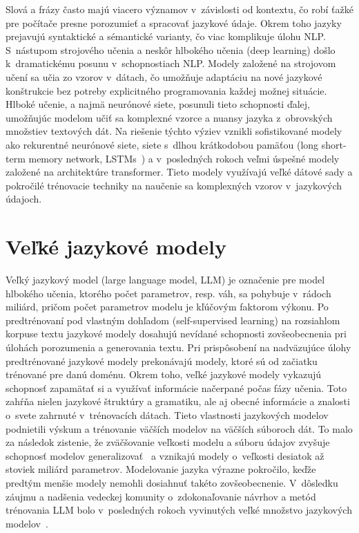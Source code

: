Slová a frázy často majú viacero významov v~závislosti od kontextu, čo robí ťažké pre počítače presne porozumieť a spracovať jazykové údaje. Okrem toho jazyky prejavujú syntaktické a sémantické varianty, čo viac komplikuje úlohu NLP. S~nástupom strojového učenia a neskôr hlbokého učenia (deep learning) došlo k~dramatickému posunu v~schopnostiach NLP. Modely založené na strojovom učení sa učia zo vzorov v~dátach, čo umožňuje adaptáciu na nové jazykové konštrukcie bez potreby explicitného programovania každej možnej situácie. Hlboké učenie, a najmä neurónové siete, posunuli tieto schopnosti ďalej, umožňujúc modelom učiť sa komplexné vzorce a nuansy jazyka z~obrovských množstiev textových dát. Na riešenie týchto výziev vznikli sofistikované modely ako rekurentné neurónové siete, siete s~dlhou krátkodobou pamäťou (long short-term memory network, LSTMs~\cite{LSTM1997}) a v~posledných rokoch veľmi úspešné modely založené na architektúre transformer. Tieto modely využívajú veľké dátové sady a pokročilé trénovacie techniky na naučenie sa komplexných vzorov v~jazykových údajoch.

\section{Veľké jazykové modely}

Veľký jazykový model (large language model, LLM) je označenie pre model hlbokého učenia, ktorého počet parametrov, resp. váh, sa pohybuje v~rádoch miliárd, pričom počet parametrov modelu je kľúčovým faktorom výkonu. Po predtrénovaní pod vlastným dohľadom (self-supervised learning) na rozsiahlom korpuse textu jazykové modely dosahujú nevídané schopnosti zovšeobecnenia pri úlohách porozumenia a generovania textu. Pri prispôsobení na nadväzujúce úlohy predtrénované jazykové modely prekonávajú modely, ktoré sú od začiatku trénované pre danú doménu. Okrem toho, veľké jazykové modely vykazujú schopnosť zapamätať si a využívať informácie načerpané počas fázy učenia. Toto zahŕňa nielen jazykové štruktúry a gramatiku, ale aj obecné informácie a znalosti o~svete zahrnuté v~trénovacích dátach. Tieto vlastnosti jazykových modelov podnietili výskum a trénovanie väčších modelov na väčších súboroch dát. To malo za následok zistenie, že zväčšovanie veľkosti modelu a súboru údajov zvyšuje schopnosť modelov generalizovať~\cite{kaplan2020scaling} a vznikajú modely o~veľkosti desiatok až stoviek miliárd parametrov. Modelovanie jazyka výrazne pokročilo, keďže predtým menšie modely nemohli dosiahnuť takéto zovšeobecnenie. V~dôsledku záujmu a nadšenia vedeckej komunity o~zdokonaľovanie návrhov a metód trénovania LLM bolo v~posledných rokoch vyvinutých veľké množstvo jazykových modelov~\cite{touvron2023llama,chowdhery2022palm,brown2020language,workshop2023bloom,almazrouei2023falcon}.

